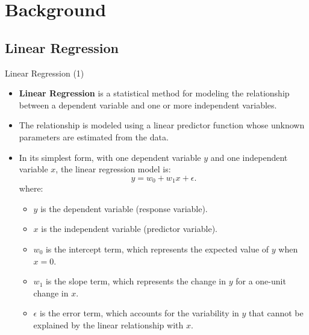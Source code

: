 \documentclass[10pt, hyperref={colorlinks = true,linkcolor = blue}]{beamer}
\begin{document}
{\section{Background}
{\subsection{Linear Regression}

\begin{frame}{Linear Regression (1) }
 \begin{itemize}[<+->]
    \item \textbf{Linear Regression} is a statistical method for modeling the relationship between a dependent variable and one or more independent variables.
    \item The relationship is modeled using a linear predictor function whose unknown parameters are estimated from the data.
    \item In its simplest form, with one dependent variable \(y\) and one independent variable \(x\), the linear regression model is:
    \[
    y = w_0 + w_1 x + \epsilon.
    \]
    where:
    \begin{itemize}
        \item \(y\) is the dependent variable (response variable).
        \item \(x\) is the independent variable (predictor variable).
        \item \(w_0\) is the intercept term, which represents the expected value of \(y\) when \(x = 0\).
        \item \(w_1\) is the slope term, which represents the change in \(y\) for a one-unit change in \(x\).
        \item \(\epsilon\) is the error term, which accounts for the variability in \(y\) that cannot be explained by the linear relationship with \(x\).
    \end{itemize}
    \end{itemize}
\end{frame}


}}
\end{document}
